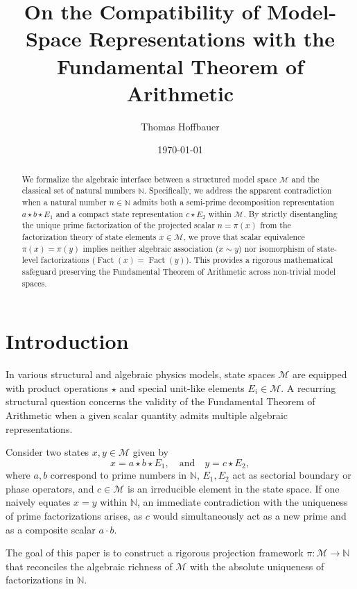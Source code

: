 \documentclass[11pt,a4paper,reqno]{amsart}
\title[Scalar Invariance and Model Space Factorization]{On the Compatibility of Model-Space Representations with the Fundamental Theorem of Arithmetic}
\author{Thomas Hoffbauer}
\date{\today}
\theoremstyle{definition}
\theoremstyle{remark}
\newcommand{\M}{\mathcal{M}}
\newcommand{\N}{\mathbb{N}}
\newcommand{\Fact}{\operatorname{Fact}}
\begin{document}
	
	\begin{abstract}
		We formalize the algebraic interface between a structured model space $\M$ and the classical set of natural numbers $\N$. Specifically, we address the apparent contradiction when a natural number $n \in \N$ admits both a semi-prime decomposition representation $a \star b \star E_1$ and a compact state representation $c \star E_2$ within $\M$. By strictly disentangling the unique prime factorization of the projected scalar $n = \pi(x)$ from the factorization theory of state elements $x \in \M$, we prove that scalar equivalence $\pi(x) = \pi(y)$ implies neither algebraic association ($x \sim y$) nor isomorphism of state-level factorizations ($\Fact(x) = \Fact(y)$). This provides a rigorous mathematical safeguard preserving the Fundamental Theorem of Arithmetic across non-trivial model spaces.
	\end{abstract}
	
	\maketitle
	
	\section{Introduction}
	
	In various structural and algebraic physics models, state spaces $\M$ are equipped with product operations $\star$ and special unit-like elements $E_i \in \M$. A recurring structural question concerns the validity of the Fundamental Theorem of Arithmetic when a given scalar quantity admits multiple algebraic representations.
	
	Consider two states $x, y \in \M$ given by
	\begin{equation}
		x = a \star b \star E_1, \quad \text{and} \quad y = c \star E_2,
	\end{equation}
	where $a, b$ correspond to prime numbers in $\N$, $E_1, E_2$ act as sectorial boundary or phase operators, and $c \in \M$ is an irreducible element in the state space. If one naively equates $x = y$ within $\N$, an immediate contradiction with the uniqueness of prime factorizations arises, as $c$ would simultaneously act as a new prime and as a composite scalar $a \cdot b$.
	
	The goal of this paper is to construct a rigorous projection framework $\pi: \M \to \N$ that reconciles the algebraic richness of $\M$ with the absolute uniqueness of factorizations in $\N$.
	
\end{document}
